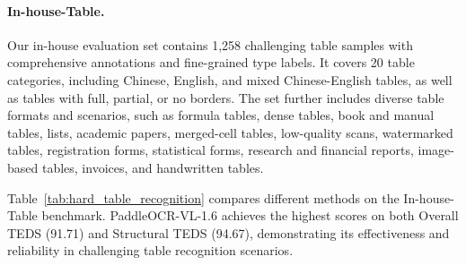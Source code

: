\documentclass[11pt, a4paper,logo,  copyright, nonumbering]{paddleocr}
\begin{document}
\paragraph{In-house-Table.}
Our in-house evaluation set contains 1,258 challenging table samples with comprehensive annotations and fine-grained type labels. It covers 20 table categories, including Chinese, English, and mixed Chinese-English tables, as well as tables with full, partial, or no borders. The set further includes diverse table formats and scenarios, such as formula tables, dense tables, book and manual tables, lists, academic papers, merged-cell tables, low-quality scans, watermarked tables, registration forms, statistical forms, research and financial reports, image-based tables, invoices, and handwritten tables.

Table~\ref{tab:hard_table_recognition} compares different methods on the In-house-Table benchmark. PaddleOCR-VL-1.6 achieves the highest scores on both Overall TEDS (91.71) and Structural TEDS (94.67), demonstrating its effectiveness and reliability in challenging table recognition scenarios.
\end{document}
